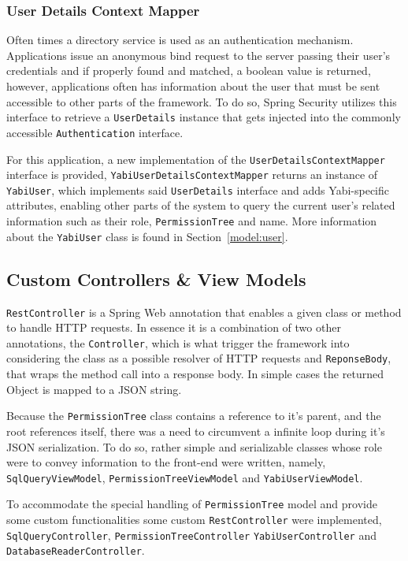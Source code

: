 \subsubsection{User Details Context Mapper}\label{impl:detailsmapper}
Often times a directory service is used as an authentication mechanism. Applications issue an anonymous bind request to the server passing their user's credentials and if properly found and matched, a boolean value is returned, however, applications often has information about the user that must be sent accessible to other parts of the framework. To do so, Spring Security utilizes this interface to retrieve a \texttt{UserDetails} instance that gets injected into the commonly accessible \texttt{Authentication} interface.

For this application, a new implementation of the \texttt{UserDetailsContextMapper} interface is provided, \texttt{YabiUserDetailsContextMapper} returns an instance of \texttt{YabiUser}, which implements said \texttt{UserDetails} interface and adds \gls{Yabi}-specific attributes, enabling other parts of the system to query the current user's related information such as their role, \texttt{PermissionTree} and name. More information about the \texttt{YabiUser} class is found in Section~\ref{model:user}.

\subsection{Custom Controllers \& View Models}
\texttt{RestController} is a Spring Web annotation that enables a given class or method to handle \gls{HTTP} requests. In essence it is a combination of two other annotations, the \texttt{Controller}, which is what trigger the framework into considering the class as a possible resolver of  \gls{HTTP} requests and \texttt{ReponseBody}, that wraps the method call into a response body. In simple cases the returned Object is mapped to a \gls{JSON} string.

Because the \texttt{PermissionTree} class contains a reference to it's parent, and the root references itself, there was a need to circumvent a infinite loop during it's \gls{JSON} serialization. To do so, rather simple and 
serializable classes whose role were to convey information to the front-end were written, namely, \texttt{SqlQueryViewModel}, \texttt{PermissionTreeViewModel} and \texttt{YabiUserViewModel}.

To accommodate the special handling of \texttt{PermissionTree} model and provide some custom functionalities some custom \texttt{RestController} were implemented, \texttt{SqlQueryController}, \texttt{PermissionTreeController} \texttt{YabiUserController} and \texttt{DatabaseReaderController}.

